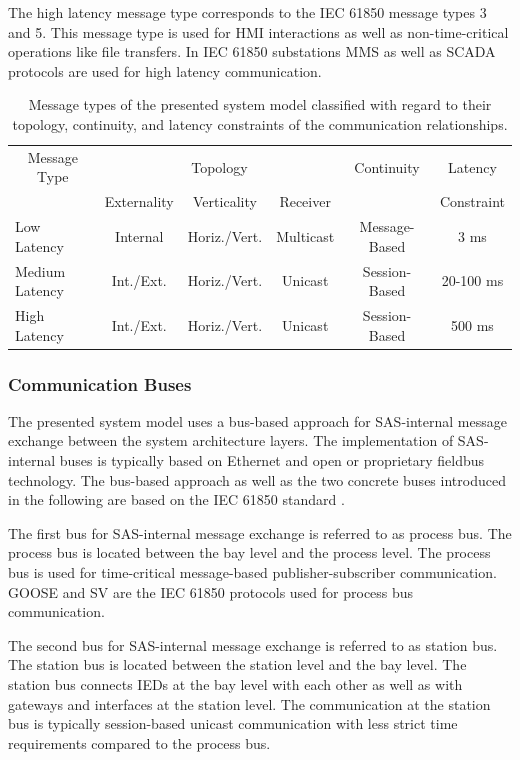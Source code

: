The high latency message type corresponds to the IEC 61850 message types 3 and 5.
This message type is used for HMI interactions as well as non-time-critical operations like file transfers.
In IEC 61850 substations MMS as well as SCADA protocols are used for high latency communication.
\begin{table}
    \centering
    \small
    \caption{Message types of the presented system model classified with regard to their topology, continuity, and latency constraints of the communication relationships.}
    \label{tab:message_types}
    \begin{tabular}{l c c c c c}
    \toprule
    \multicolumn{1}{c}{Message Type} & \multicolumn{3}{c}{Topology} & Continuity & Latency\\
    & Externality & Verticality & Receiver & & Constraint\\
    \midrule
    Low Latency & Internal & Horiz./Vert. & Multicast & Message-Based & 3 ms\\
    Medium Latency & Int./Ext. & Horiz./Vert. & Unicast & Session-Based & 20-100 ms\\
    High Latency & Int./Ext. & Horiz./Vert. & Unicast & Session-Based & 500 ms\\
    \bottomrule
    \end{tabular}
\end{table}

\subsubsection{Communication Buses}
The presented system model uses a bus-based approach for SAS-internal message exchange between the system architecture layers.
The implementation of SAS-internal buses is typically based on Ethernet and open or proprietary fieldbus technology.
The bus-based approach as well as the two concrete buses introduced in the following are based on the IEC 61850 standard \cite{IEC61850P5}.

The first bus for SAS-internal message exchange is referred to as process bus.
The process bus is located between the bay level and the process level.
The process bus is used for time-critical message-based publisher-subscriber communication.
GOOSE and SV are the IEC 61850 protocols used for process bus communication.

The second bus for SAS-internal message exchange is referred to as station bus.
The station bus is located between the station level and the bay level.
The station bus connects IEDs at the bay level with each other as well as with gateways and interfaces at the station level.
The communication at the station bus is typically session-based unicast communication with less strict time requirements compared to the process bus.

